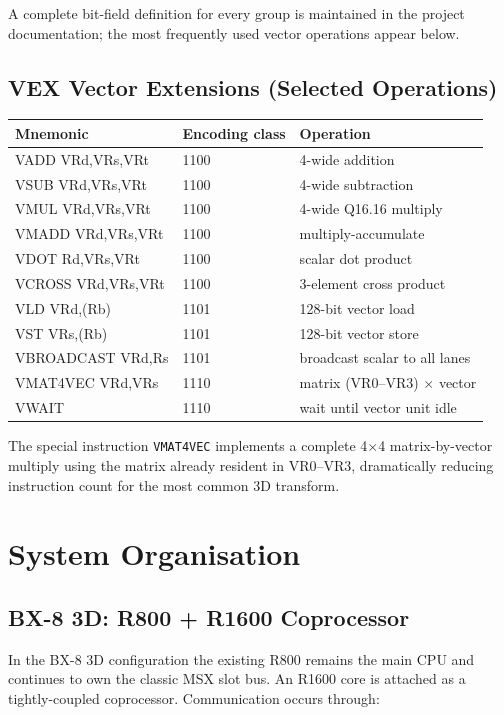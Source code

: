 \documentclass[11pt,a4paper]{article}
\begin{document}
A complete bit-field definition for every group is maintained in the project documentation; the most frequently used vector operations appear below.

\subsection{VEX Vector Extensions (Selected Operations)}

\begin{center}
\begin{tabular}{@{}llp{5.5cm}@{}}
\toprule
Mnemonic & Encoding class & Operation \\
\midrule
VADD VRd,VRs,VRt & 1100 & 4-wide addition \\
VSUB VRd,VRs,VRt & 1100 & 4-wide subtraction \\
VMUL VRd,VRs,VRt & 1100 & 4-wide Q16.16 multiply \\
VMADD VRd,VRs,VRt & 1100 & multiply-accumulate \\
VDOT Rd,VRs,VRt & 1100 & scalar dot product \\
VCROSS VRd,VRs,VRt & 1100 & 3-element cross product \\
VLD VRd,(Rb) & 1101 & 128-bit vector load \\
VST VRs,(Rb) & 1101 & 128-bit vector store \\
VBROADCAST VRd,Rs & 1101 & broadcast scalar to all lanes \\
VMAT4VEC VRd,VRs & 1110 & matrix (VR0--VR3) $\times$ vector \\
VWAIT & 1110 & wait until vector unit idle \\
\bottomrule
\end{tabular}
\end{center}

The special instruction \texttt{VMAT4VEC} implements a complete 4$\times$4 matrix-by-vector multiply using the matrix already resident in VR0--VR3, dramatically reducing instruction count for the most common 3D transform.

\section{System Organisation}

\subsection{BX-8 3D: R800 + R1600 Coprocessor}

In the BX-8 3D configuration the existing R800 remains the main CPU and continues to own the classic MSX slot bus. An R1600 core is attached as a tightly-coupled coprocessor. Communication occurs through:
\end{document}
